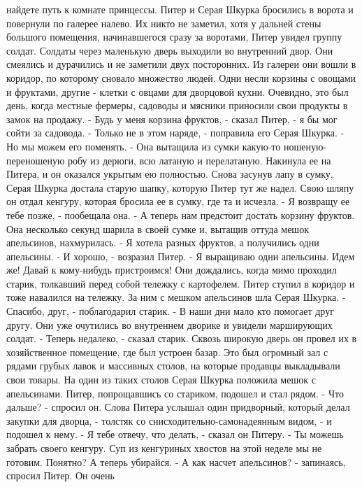 найдете путь к комнате принцессы.
    Питер и Серая Шкурка бросились в ворота и повернули по галерее 
налево. Их никто не заметил, хотя у дальней стены большого помещения, 
начинавшегося сразу за воротами, Питер увидел группу солдат. Солдаты 
через маленькую дверь выходили во внутренний двор. Они смеялись и 
дурачились и не заметили двух посторонних.
    Из галереи они вошли в коридор, по которому сновало множество 
людей. Одни несли корзины с овощами и фруктами, другие - клетки с 
овцами для дворцовой кухни. Очевидно, это был день, когда местные 
фермеры, садоводы и мясники приносили свои продукты в замок на 
продажу.
    - Будь у меня корзина фруктов, - сказал Питер, - я бы мог сойти за 
садовода.
    - Только не в этом наряде, - поправила его Серая Шкурка. - Но мы 
можем его поменять. - Она вытащила из сумки какую-то ношеную-
переношеную робу из дерюги, всю латаную и перелатаную. Накинула ее на 
Питера, и он оказался укрытым ею полностью. Снова засунув лапу в 
сумку, Серая Шкурка достала старую шапку, которую Питер тут же надел. 
Свою шляпу он отдал кенгуру, которая бросила ее в сумку, где та и 
исчезла.
    - Я возвращу ее тебе позже, - пообещала она. - А теперь нам 
предстоит достать корзину фруктов.
    Она несколько секунд шарила в своей сумке и, вытащив оттуда мешок 
апельсинов, нахмурилась.
    - Я хотела разных фруктов, а получились одни апельсины.
    - И хорошо, - возразил Питер. - Я выращиваю одни апельсины. Идем 
же! Давай к кому-нибудь пристроимся!
    Они дождались, когда мимо проходил старик, толкавший перед собой 
тележку с картофелем. Питер ступил в коридор и тоже навалился на 
тележку. За ним с мешком апельсинов шла Серая Шкурка.
    - Спасибо, друг, - поблагодарил старик. - В наши дни мало кто 
помогает друг другу.
    Они уже очутились во внутреннем дворике и увидели марширующих 
солдат.
    - Теперь недалеко, - сказал старик. Сквозь широкую дверь он провел 
их в хозяйственное помещение, где был устроен базар. Это был огромный 
зал с рядами грубых лавок и массивных столов, на которые продавцы 
выкладывали свои товары.
    На один из таких столов Серая Шкурка положила мешок с апельсинами. 
Питер, попрощавшись со стариком, подошел и стал рядом.
    - Что дальше? - спросил он.
    Слова Питера услышал один придворный, который делал закупки для 
дворца, - толстяк со снисходительно-самонадеянным видом, - и подошел к 
нему.
    - Я тебе отвечу, что делать, - сказал он Питеру. - Ты можешь 
забрать своего кенгуру. Суп из кенгуриных хвостов на этой неделе мы не 
готовим. Понятно? А теперь убирайся.
    - А как насчет апельсинов? - запинаясь, спросил Питер. Он очень 
